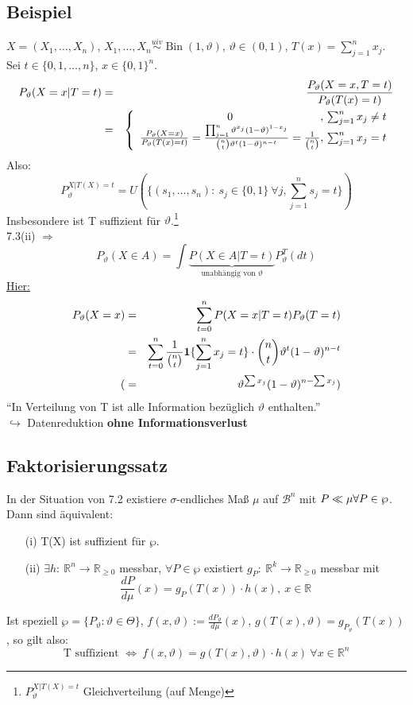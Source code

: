 \documentclass[a4paper,11pt,twoside,titlepage]{article}
\newcommand{\R}{{\mathbb R}}
\newcommand\BB{ \mathcal{B} } %
\newcommand{\ind}{\text{\bf{1}}} %
\newcommand{\uiv}{\ensuremath{\stackrel{uiv}{\sim}}}
\DeclareMathOperator{\Bin}{Bin}
\begin{document}
\subsection{Beispiel}
$X=(X_1,\ldots,X_n)$, $X_1,\ldots,X_n\uiv\Bin(1,\vartheta)$, $\vartheta\in(0,1)$, $T(x)=\sum_{j=1}^n x_j$.\\
Sei $t\in\{0,1,\ldots,n\}$, $x\in\{0,1\}^n$.
\begin{eqnarray*}
P_\vartheta(X=x|T=t)&=&\frac{P_\vartheta(X=x,T=t)}{P_\vartheta(T(x)=t)}\\&=&\left\{\begin{array}{c@{,\ }l}
0&\sum_{j=1}^nx_j\neq t\\\frac{P_\vartheta(X=x)}{P_\vartheta(T(x)=t)}=\frac{\prod_{j=1}^n\vartheta^{x_j}(1-\vartheta)^{1-x_j}}{{n\choose t}\vartheta^t(1-\vartheta)^{n-t}}=\frac{1}{{n\choose t}}&\sum_{j=1}^n x_j=t\end{array}\right.\end{eqnarray*}
Also:
\[P_\vartheta^{X|T(X)=t}=U(\{(s_1,\ldots,s_n):\ s_j\in\{0,1\}\ \forall j,\sum_{j=1}^ns_j=t\})\]
Insbesondere ist T suffizient für $\vartheta$.\footnote{$P_\vartheta^{X|T(X)=t}$ Gleichverteilung (auf Menge)}\\
7.3(ii) $\Rightarrow$ 
\[P_\vartheta (X\in A)=\int\underbrace{P(X\in A|T=t)}_{\mbox{unabhängig von }\vartheta}P_\vartheta^T(dt)\]
\underline{Hier:}
\begin{eqnarray*}
P_\vartheta(X=x)&=&\sum_{t=0}^n P(X=x|T=t)P_\vartheta(T=t)\\
&=&\sum_{t=0}^n\frac{1}{{n\choose t}}\ind\{\sum_{j=1}^nx_j=t\}\cdot {n\choose t}\vartheta^t(1-\vartheta)^{n-t}\\
(&=&\vartheta^{\sum x_j}(1-\vartheta)^{n-\sum x_j})
\end{eqnarray*}
"`In Verteilung von T ist alle Information bezüglich $\vartheta$ enthalten."'\\
$\hookrightarrow$ Datenreduktion \textbf{ohne Informationsverlust}

\subsection{Faktorisierungssatz}
In der Situation von 7.2 existiere $\sigma$-endliches Maß $\mu$ auf $\BB^n$ mit $P\ll\mu\\ \forall P\in\wp$. Dann sind äquivalent:
\begin{itemize}
\item[(i)] T(X) ist suffizient für $\wp$.
\item[(ii)] $\exists h:\ \R^n\to\R_{\geq0}$ messbar, $\forall P\in\wp$ existiert $g_P:\ \R^k\to\R_{\geq0}$ messbar mit
\[\frac{dP}{d\mu}(x)=g_P(T(x))\cdot h(x),\ x\in\R\]
\end{itemize}
Ist speziell $\wp=\{P_\vartheta: \vartheta\in\Theta\}$, $f(x,\vartheta):=\frac{dP_\vartheta}{d\mu}(x)$,  $g(T(x),\vartheta)=g_{P_\vartheta}(T(x))$, so gilt also:
\[\mbox{T suffizient }\Leftrightarrow\ f(x,\vartheta)=g(T(x),\vartheta)\cdot h(x)\ \forall x\in\R^n\]
\end{document}
